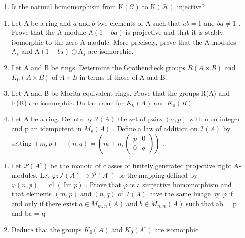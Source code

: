 \begin{enumerate}
\def\labelenumi{\alph{enumi})}
\setcounter{enumi}{3}
\tightlist
\item
  Is the natural homomorphism from \(\mathrm{K}(\mathcal{C})\) to \(\mathrm{K}(\mathcal{H})\) injective?
\end{enumerate}

\begin{enumerate}
\def\labelenumi{\arabic{enumi})}
\setcounter{enumi}{1}
\item
  Let \(\mathrm{A}\) be a ring and \(a\) and \(b\) two elements of \(\mathrm{A}\) such that \(ab = 1\) and \(ba \neq 1\) . Prove that the A-module \(\mathrm{A}(1 - ba)\) is projective and that it is stably isomorphic to the zero A-module. More precisely, prove that the A-modules \(\mathrm{A}_s\) and \(\mathrm{A}(1 - ba) \oplus \mathrm{A}_s\) are isomorphic.
\item
  Let A and B be rings. Determine the Grothendieck groups \(R(A \times B)\) and \(K_{0}(A \times B)\) of \(A \times B\) in terms of those of A and B.
\item
  Let A and B be Morita equivalent rings. Prove that the groups R(A) and R(B) are isomorphic. Do the same for \(K_{0}(A)\) and \(K_{0}(B)\) .
\item
  Let A be a ring. Denote by \(\mathcal{I}(A)\) the set of pairs \((n,p)\) with n an integer and p an idempotent in \(M_{n}(A)\) . Define a law of addition on \(\mathcal{I}(A)\) by setting \((m,p)+(n,q)=(m+n,\begin{pmatrix} p & 0 \\ 0 & q \end{pmatrix})\) .
\end{enumerate}

\begin{enumerate}
\def\labelenumi{\alph{enumi})}
\item
  Let \(\mathcal{P}(A^{\circ})\) be the monoid of classes of finitely generated projective right A-modules. Let \(\varphi: \mathcal{I}(A) \to \mathcal{P}(A^{\circ})\) be the mapping defined by \(\varphi(n,p) = \operatorname{cl}(\operatorname{Im}p)\) . Prove that \(\varphi\) is a surjective homomorphism and that elements \((m,p)\) and \((n,q)\) of \(\mathcal{I}(A)\) have the same image by \(\varphi\) if and only if there exist \(a \in M_{m,n}(A)\) and \(b \in M_{n,m}(A)\) such that ab = p and ba = q.
\item
  Deduce that the groups \(K_{0}(A)\) and \(K_{0}(A^{\circ})\) are isomorphic.
\end{enumerate}

